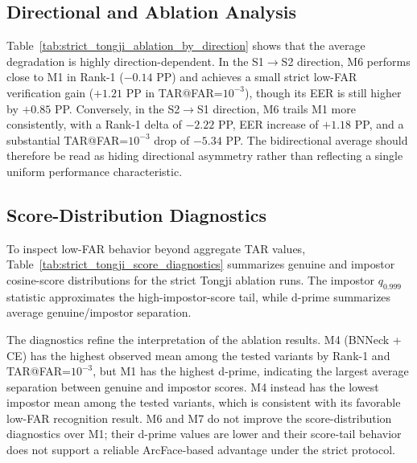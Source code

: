 \subsection{Directional and Ablation Analysis}



Table~\ref{tab:strict_tongji_ablation_by_direction} shows that the average degradation is highly direction-dependent. In the S1$\rightarrow$S2 direction, M6 performs close to M1 in Rank-1 ($-0.14$ PP) and achieves a small strict low-FAR verification gain ($+1.21$ PP in TAR@FAR=$10^{-3}$), though its EER is still higher by $+0.85$ PP. Conversely, in the S2$\rightarrow$S1 direction, M6 trails M1 more consistently, with a Rank-1 delta of $-2.22$ PP, EER increase of $+1.18$ PP, and a substantial TAR@FAR=$10^{-3}$ drop of $-5.34$ PP. The bidirectional average should therefore be read as hiding directional asymmetry rather than reflecting a single uniform performance characteristic.

\subsection{Score-Distribution Diagnostics}

To inspect low-FAR behavior beyond aggregate TAR values, Table~\ref{tab:strict_tongji_score_diagnostics} summarizes genuine and impostor cosine-score distributions for the strict Tongji ablation runs. The impostor $q_{0.999}$ statistic approximates the high-impostor-score tail, while d-prime summarizes average genuine/impostor separation.



The diagnostics refine the interpretation of the ablation results. M4 (BNNeck + CE) has the highest observed mean among the tested variants by Rank-1 and TAR@FAR=$10^{-3}$, but M1 has the highest d-prime, indicating the largest average separation between genuine and impostor scores. M4 instead has the lowest impostor mean among the tested variants, which is consistent with its favorable low-FAR recognition result. M6 and M7 do not improve the score-distribution diagnostics over M1; their d-prime values are lower and their score-tail behavior does not support a reliable ArcFace-based advantage under the strict protocol.



